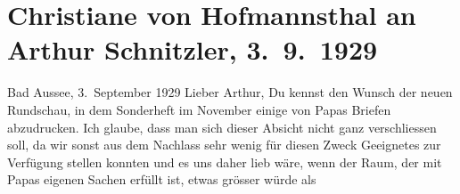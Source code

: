 

         
         \renewcommand{\erwaehntePersonen}{Personen: Christiane von Hofmannsthal, Hugo von Hofmannsthal, Rudolf Kayser}
         \renewcommand{\erwaehnteInstitutionen}{Institutionen: Neue Rundschau, Neue Deutsche Rundschau, Freie Bühne}
         \renewcommand{\erwaehnteOrte}{Orte: Bad Aussee, Wien}
         \renewcommand{\erwaehnteWerke}{Werke: Aus dem Nachlass}
               \section[Christiane von Hofmannsthal an Arthur Schnitzler, 3. 9. 1929]{ Christiane von Hofmannsthal an Arthur Schnitzler, 3. 9. 1929}\nopagebreak{}\rehead{ }\begin{ledgroupsized}[t]{13cm}\normalsize\beginnumbering \toendnotes[C]{\smallbreak\pagebreak[2]} 
\toendnotes[C]{\smallbreak}\pstart
           \raggedleft{}{\pb}Bad Aussee, 3. September 1929\pend
           \pstart{}Lieber Arthur,\pend\pstart
           Du kennst den Wunsch der neuen Rundschau, in dem
                  Sonderheft im November einige von Papas Briefen abzudrucken.
               Ich glaube, dass man sich dieser Absicht nicht ganz verschliessen soll, da wir sonst
               aus dem Nachlass sehr wenig für diesen Zweck Geeignetes zur Verfügung stellen konnten
               und es uns daher lieb wäre, wenn der Raum, der mit Papas eigenen Sachen erfüllt ist, etwas grösser würde als

\end{ledgroupsized}

